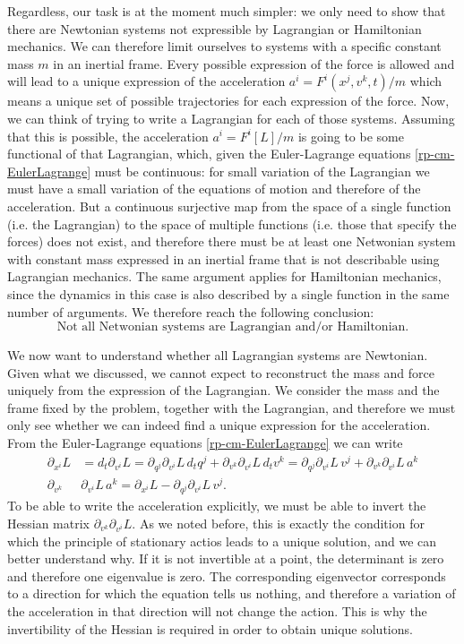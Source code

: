 Regardless, our task is at the moment much simpler: we only need to show that there are Newtonian systems not expressible by Lagrangian or Hamiltonian mechanics. We can therefore limit ourselves to systems with a specific constant mass $m$ in an inertial frame. Every possible expression of the force is allowed and will lead to a unique expression of the acceleration $a^i=F^i(x^j, v^k, t)/m$ which means a unique set of possible trajectories for each expression of the force. Now, we can think of trying to write a Lagrangian for each of those systems. Assuming that this is possible, the acceleration $a^i=F^i[L]/m$ is going to be some functional of that Lagrangian, which, given the Euler-Lagrange equations \ref{rp-cm-EulerLagrange} must be continuous: for small variation of the Lagrangian we must have a small variation of the equations of motion and therefore of the acceleration. But a continuous surjective map from the space of a single function (i.e. the Lagrangian) to the space of multiple functions (i.e. those that specify the forces) does not exist, and therefore there must be at least one Netwonian system with constant mass expressed in an inertial frame that is not describable using Lagrangian mechanics. The same argument applies for Hamiltonian mechanics, since the dynamics in this case is also described by a single function in the same number of arguments. We therefore reach the following conclusion:
\begin{equation}
	\textrm{Not all Netwonian systems are Lagrangian and/or Hamiltonian.}
\end{equation}

We now want to understand whether all Lagrangian systems are Newtonian. Given what we discussed, we cannot expect to reconstruct the mass and force uniquely from the expression of the Lagrangian. We consider the mass and the frame fixed by the problem, together with the Lagrangian, and therefore we must only see whether we can indeed find a unique expression for the acceleration. From the Euler-Lagrange equations \ref{rp-cm-EulerLagrange} we can write
\begin{equation}
	\begin{aligned}
	\partial_{x^i}L&=d_t \partial_{v^i} L=\partial_{q^j} \partial_{v^i} L \, d_t q^j + \partial_{v^k} \partial_{v^i} L \, d_t v^k = \partial_{q^j} \partial_{v^i} L \, v^j + \partial_{v^k} \partial_{v^i} L \, a^k \\
	\partial_{v^k} &\partial_{v^i} L \, a^k = \partial_{x^i}L - \partial_{q^j} \partial_{v^i} L \, v^j .
	\end{aligned}
\end{equation}
To be able to write the acceleration explicitly, we must be able to invert the Hessian matrix $\partial_{v^k} \partial_{v^i} L$. As we noted before, this is exactly the condition for which the principle of stationary actios leads to a unique solution, and we can better understand why. If it is not invertible at a point, the determinant is zero and therefore one eigenvalue is zero. The corresponding eigenvector corresponds to a direction for which the equation tells us nothing, and therefore a variation of the acceleration in that direction will not change the action. This is why the invertibility of the Hessian is required in order to obtain unique solutions.


